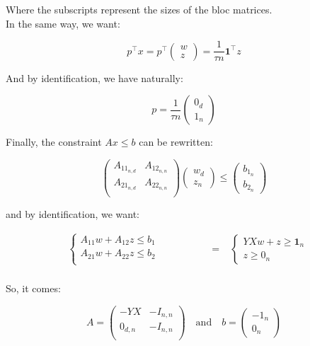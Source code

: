 \documentclass[11pt]{article}
\numberwithin{figure}{section} %
\begin{document}
Where the subscripts represent the sizes of the bloc matrices. \\

In the same way, we want:

$$
p^{\intercal} x = p^{\intercal}\begin{pmatrix} 
w \\
z 
\end{pmatrix} =  \frac{1}{\tau n} \mathbf{1}^{\intercal} z
$$

And by identification, we have naturally:

\begin{framed} 
$$
p = \frac{1}{\tau n} \begin{pmatrix} 
0_{d} \\
1_{n}
\end{pmatrix}
$$
\end{framed} 

Finally, the constraint $Ax \leq b$ can be rewritten:

$$
\begin{pmatrix} 
A_{{11}_{n,d}} & A_{{12}_{n,n}}\\
A_{{21}_{n,d}} & A_{{22}_{n,n}}\\
\end{pmatrix}
\begin{pmatrix} 
w_{d} \\
z_{n}
\end{pmatrix}
\leq
\begin{pmatrix} 
b_{1_{n}} \\
b_{2_{n}}
\end{pmatrix}
$$

and by identification, we want:

\begin{align*}
&\left\{ 
	\begin{aligned}
	A_{11}w + A_{12}z \leq b_1  \\
	A_{21}w + A_{22}z \leq b_2 \\
	\end{aligned}\right.
\quad\quad\quad\quad\quad =
&
\left\{ 
	\begin{aligned}
	YXw + z \geq \mathbf{1}_{n}  \\
	z \geq 0_{n}
	\end{aligned}\right. \\
\end{align*}

So, it comes:

\begin{framed} 
$$
A = \begin{pmatrix} 
-YX &  -I_{n,n}\\
0_{d,n} & -I_{n,n}\\
\end{pmatrix}
\quad\text{and}\quad
b = \begin{pmatrix} 
- 1_{n} \\
0_{n}
\end{pmatrix}
$$
\end{framed} 
\end{document}
